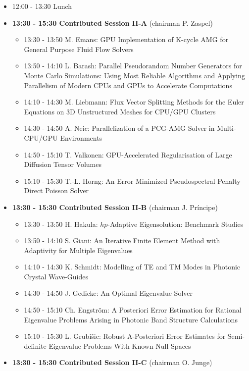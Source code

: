 \documentclass[10pt, A4]{article}%
\begin{document}
\begin{itemize}
\begin{itemize}
  \end{itemize}
  \item 12:00 - 13:30 Lunch
  \item {\bf 13:30 - 15:30 Contributed Session II-A} (chairman P. Zaspel) 
  \begin{itemize}
    \item 13:30 - 13:50 M. Emans: GPU Implementation of K-cycle AMG for General Purpose Fluid Flow Solvers
    \item 13:50 - 14:10 L. Barash: Parallel Pseudorandom Number Generators for Monte Carlo Simulations: Using Most Reliable Algorithms and Applying Parallelism of Modern CPUs and GPUs to Accelerate Computations
    \item 14:10 - 14:30 M. Liebmann: Flux Vector Splitting Methods for the Euler Equations on 3D Unstructured Meshes for CPU/GPU Clusters
    \item 14:30 - 14:50 A. Neic: Parallelization of a PCG-AMG Solver in Multi-CPU/GPU Environments
    \item 14:50 - 15:10 T. Valkonen: GPU-Accelerated Regularisation of Large Diffusion Tensor Volumes
    \item 15:10 - 15:30 T.-L. Horng: An Error Minimized Pseudospectral Penalty Direct Poisson Solver
  \end{itemize}
  \item {\bf 13:30 - 15:30 Contributed Session II-B} (chairman J. Pr\'{i}ncipe) 
  \begin{itemize}
    \item 13:30 - 13:50 H. Hakula: $hp$-Adaptive Eigensolution: Benchmark Studies
    \item 13:50 - 14:10 S. Giani: An Iterative Finite Element Method with Adaptivity for Multiple Eigenvalues
    \item 14:10 - 14:30 K. Schmidt: Modelling of TE and TM Modes in Photonic Crystal Wave-Guides
    \item 14:30 - 14:50 J. Gedicke: An Optimal Eigenvalue Solver
    \item 14:50 - 15:10 Ch. Engstr\"{o}m: A Posteriori Error Estimation for Rational Eigenvalue Problems Arising in Photonic Band Structure Calculations
    \item 15:10 - 15:30 L. Grubi\v{s}ic: Robust A-Posteriori Error Estimates for Semi-definite Eigenvalue Problems With Known Null Spaces
  \end{itemize}
\newpage
    \item {\bf 13:30 - 15:30 Contributed Session II-C} (chairman O. Junge) 
  \begin{itemize}

\end{itemize}
\end{itemize}
\end{document}

